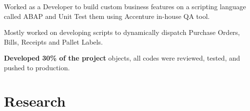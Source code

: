 \documentclass[letterpaper]{kishore-resume} %
\begin{document}
\begin{minipage}[t]{0.66\textwidth}





\begin{tightitemize}
\item Worked as a Developer to build custom business features on a scripting language called ABAP and Unit Test them using Accenture in-house QA tool.
\item Mostly worked on developing scripts to dynamically dispatch Purchase Orders, Bills, Receipts and Pallet Labels. 
\item \textbf{Developed 30\% of the project} objects, all codes were reviewed, tested, and pushed to production.
\end{tightitemize}




\section{Research}




\end{minipage}
\end{document}
